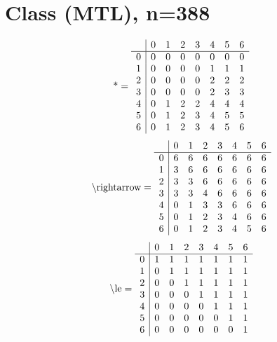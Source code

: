 \documentclass[11pt]{article}
\begin{document}
\section{Class (MTL), n=388}
\[\text{*} = 
\begin{array}{r | r r r r r r r}
 & 0 & 1 & 2 & 3 & 4 & 5 & 6 \\ \hline
0 & 0 & 0 & 0 & 0 & 0 & 0 & 0 \\
1 & 0 & 0 & 0 & 0 & 1 & 1 & 1 \\
2 & 0 & 0 & 0 & 0 & 2 & 2 & 2 \\
3 & 0 & 0 & 0 & 0 & 2 & 3 & 3 \\
4 & 0 & 1 & 2 & 2 & 4 & 4 & 4 \\
5 & 0 & 1 & 2 & 3 & 4 & 5 & 5 \\
6 & 0 & 1 & 2 & 3 & 4 & 5 & 6 \\
\end{array}
\]
\[\text{\textbackslash rightarrow} = 
\begin{array}{r | r r r r r r r}
 & 0 & 1 & 2 & 3 & 4 & 5 & 6 \\ \hline
0 & 6 & 6 & 6 & 6 & 6 & 6 & 6 \\
1 & 3 & 6 & 6 & 6 & 6 & 6 & 6 \\
2 & 3 & 3 & 6 & 6 & 6 & 6 & 6 \\
3 & 3 & 3 & 4 & 6 & 6 & 6 & 6 \\
4 & 0 & 1 & 3 & 3 & 6 & 6 & 6 \\
5 & 0 & 1 & 2 & 3 & 4 & 6 & 6 \\
6 & 0 & 1 & 2 & 3 & 4 & 5 & 6 \\
\end{array}
\]
\[\text{\textbackslash le} = 
\begin{array}{r | r r r r r r r}
 & 0 & 1 & 2 & 3 & 4 & 5 & 6 \\ \hline
0 & 1 & 1 & 1 & 1 & 1 & 1 & 1 \\
1 & 0 & 1 & 1 & 1 & 1 & 1 & 1 \\
2 & 0 & 0 & 1 & 1 & 1 & 1 & 1 \\
3 & 0 & 0 & 0 & 1 & 1 & 1 & 1 \\
4 & 0 & 0 & 0 & 0 & 1 & 1 & 1 \\
5 & 0 & 0 & 0 & 0 & 0 & 1 & 1 \\
6 & 0 & 0 & 0 & 0 & 0 & 0 & 1 \\
\end{array}
\]
\end{document}
